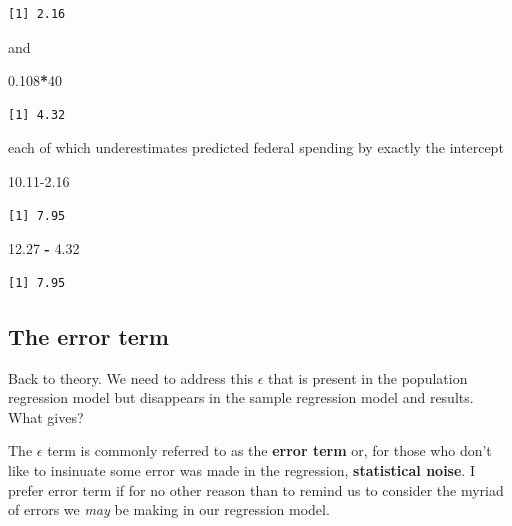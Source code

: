 \documentclass[
]{book}
\makeatletter
\newenvironment{Shaded}{\begin{snugshade}}{\end{snugshade}}
\newcommand{\DecValTok}[1]{\textcolor[rgb]{0.06,0.06,0.06}{#1}}
\newcommand{\FloatTok}[1]{\textcolor[rgb]{0.06,0.06,0.06}{#1}}
\newcommand{\SpecialCharTok}[1]{\textcolor[rgb]{0.43,0.43,0.43}{\textbf{#1}}}
\newenvironment{kframe}{%
\medskip{}
\setlength{\fboxsep}{.8em}
 \def\at@end@of@kframe{}%
 \ifinner\ifhmode%
  \def\at@end@of@kframe{\end{minipage}}%
  \begin{minipage}{\columnwidth}%
 \fi\fi%
 \def\FrameCommand##1{\hskip\@totalleftmargin \hskip-\fboxsep
 \colorbox{shadecolor}{##1}\hskip-\fboxsep
     \hskip-\linewidth \hskip-\@totalleftmargin \hskip\columnwidth}%
 \MakeFramed {\advance\hsize-\width
   \@totalleftmargin\z@ \linewidth\hsize
   \@setminipage}}%
 {\par\unskip\endMakeFramed%
 \at@end@of@kframe}
\renewenvironment{Shaded}{\begin{kframe}}{\end{kframe}}
\makeatother
\begin{document}
\begin{verbatim}
[1] 2.16
\end{verbatim}

and

\begin{Shaded}
\begin{Highlighting}[]
\FloatTok{0.108}\SpecialCharTok{*}\DecValTok{40}
\end{Highlighting}
\end{Shaded}

\begin{verbatim}
[1] 4.32
\end{verbatim}

each of which underestimates predicted federal spending by exactly the intercept

\begin{Shaded}
\begin{Highlighting}[]
\FloatTok{10.11{-}2.16}
\end{Highlighting}
\end{Shaded}

\begin{verbatim}
[1] 7.95
\end{verbatim}

\begin{Shaded}
\begin{Highlighting}[]
\FloatTok{12.27} \SpecialCharTok{{-}} \FloatTok{4.32}
\end{Highlighting}
\end{Shaded}

\begin{verbatim}
[1] 7.95
\end{verbatim}

\hypertarget{the-error-term}{%
\subsection{The error term}\label{the-error-term}}

Back to theory. We need to address this \(\epsilon\) that is present in the population regression model but disappears in the sample regression model and results. What gives?

The \(\epsilon\) term is commonly referred to as the \textbf{error term} or, for those who don't like to insinuate some error was made in the regression, \textbf{statistical noise}. I prefer error term if for no other reason than to remind us to consider the myriad of errors we \emph{may} be making in our regression model.
\end{document}
